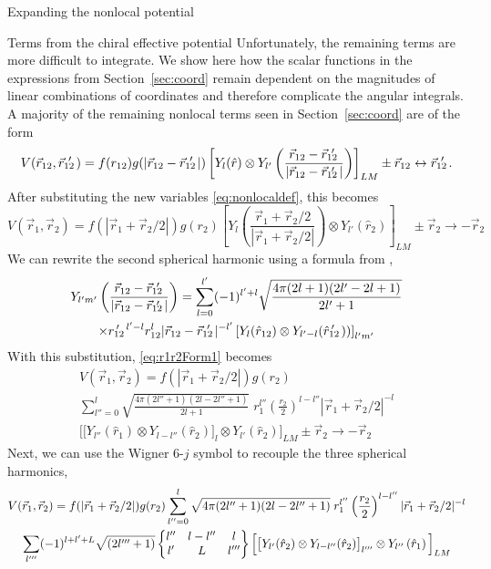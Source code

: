 \begin{section}{Expanding the nonlocal potential}
\begin{subsection}{Terms from the chiral effective potential}
Unfortunately, the remaining terms are more difficult to integrate. We show here how the scalar functions in the expressions from Section~\ref{sec:coord} remain dependent on the magnitudes of linear combinations of coordinates and therefore complicate the angular integrals. A majority of the remaining nonlocal terms seen in Section~\ref{sec:coord} are of the form
%
\begin{equation}
V(\rot,\rotp)=f(r_{12})g(|\rot-\rotp |) \left[Y_{l}(\hat{r})\otimes Y_{l'}\left(\frac{\rot-\rotp}{|\rot-\rotp |}\right)\right]_{L M}\pm \rot\leftrightarrow \rotp.
\end{equation}
%
After substituting the new variables \eqref{eq:nonlocaldef}, this becomes
%
\begin{equation}\label{eq:r1r2Form1}
V(\vec{r}_1,\vec{r}_2)=f(|\vec{r}_1+\vec{r}_2/2|)g(r_2) \left[Y_{l}\left(\frac{\vec{r}_1+\vec{r}_2/2}{|\vec{r}_1+\vec{r}_2/2|}\right)\otimes Y_{l'}\left(\hat{r}_2\right)\right]_{L M} \pm \vec{r}_2\rightarrow -\vec{r}_2
\end{equation} 
%
We can rewrite the second spherical harmonic using a formula from \cite{varshalovich1988},
%
\begin{multline}
Y_{l'm'}\left(\frac{\rot-\rotp}{|\rot-\rotp |}\right) = \sum_{l=0}^{l'}(-1)^{l'+l}\sqrt{\frac{4\pi(2l+1)(2l'-2l+1)}{2l'+1}} \\
\times \rotpr^{l'-l} r_{12}^l |\rot-\rotp|^{-l'}\left[Y_{l}(\hat{r}_{12})\otimes Y_{l'-l}(\rotphat))\right]_{l'm'}
\end{multline}
With this substitution, \eqref{eq:r1r2Form1} becomes
\begin{multline}
V(\vec{r}_1,\vec{r}_2)=f(|\vec{r}_1+\vec{r}_2/2|)g(r_2) \\
\sum_{l''=0}^{l} \sqrt{\frac{4\pi(2l''+1)(2l-2l''+1)}{2l+1}} \;r_1^{l''} \left(\frac{r_2}{2}\right)^{l-l''}|\vec{r}_1+\vec{r}_2/2|^{-l} \\
 \Big[\big[Y_{l''}(\hat{r}_1) \otimes Y_{l-l''}(\hat{r}_2) \big]_l \otimes Y_{l'}\left(\hat{r}_2\right)\Big]_{L M} \pm \vec{r}_2 \rightarrow -\vec{r}_2
\end{multline}
Next, we can use the Wigner 6-$j$ symbol to recouple the three spherical harmonics, 
\begin{multline}
V(\vec{r}_1,\vec{r}_2)=f(|\vec{r}_1+\vec{r}_2/2|)g(r_2) 
\sum_{l''=0}^{l} \sqrt{4\pi(2l''+1)(2l-2l''+1)} \;r_1^{l''} \left(\frac{r_2}{2}\right)^{l-l''}|\vec{r}_1+\vec{r}_2/2|^{-l} \\
\sum_{l'''} (-1)^{l+l'+L} \sqrt{(2l'''+1)} \sixj{l''}{l-l''}{l}{l'}{L}{l'''} \Big[\big[Y_{l'}(\hat{r}_2) \otimes Y_{l-l''}(\hat{r}_2) \big]_{l'''} \otimes Y_{l''}\left(\hat{r}_1\right)\Big]_{L M} \\

\end{multline}
\end{subsection}
\end{section}
